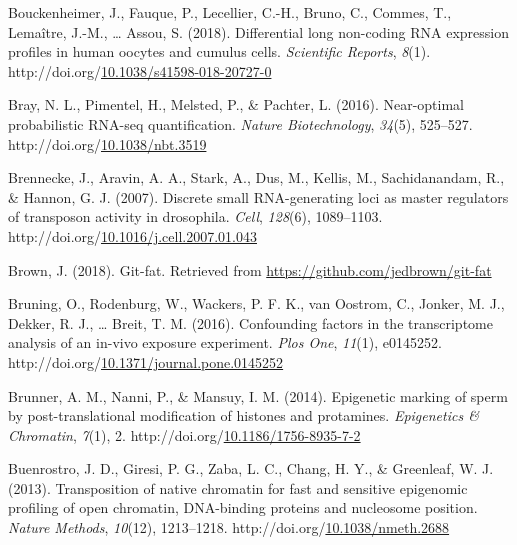 \documentclass[12pt,twoside]{reedthesis}
\newlength{\cslhangindent}
\newenvironment{CSLReferences}[2] %
 {%
  \setlength{\parindent}{0pt}
  \ifodd #1 \everypar{\setlength{\hangindent}{\cslhangindent}}\ignorespaces\fi
  \ifnum #2 > 0
  \setlength{\parskip}{#2\baselineskip}
  \fi
 }%
 {}
\begin{document}
\begin{CSLReferences}{1}{0}
\leavevmode{}%
Bouckenheimer, J., Fauque, P., Lecellier, C.-H., Bruno, C., Commes, T., Lemaître, J.-M., \ldots{} Assou, S. (2018). Differential long non-coding RNA expression profiles in human oocytes and cumulus cells. \emph{Scientific Reports}, \emph{8}(1). http://doi.org/\href{https://doi.org/10.1038/s41598-018-20727-0}{10.1038/s41598-018-20727-0}

\leavevmode{}%
Bray, N. L., Pimentel, H., Melsted, P., \& Pachter, L. (2016). Near-optimal probabilistic RNA-seq quantification. \emph{Nature Biotechnology}, \emph{34}(5), 525--527. http://doi.org/\href{https://doi.org/10.1038/nbt.3519}{10.1038/nbt.3519}

\leavevmode{}%
Brennecke, J., Aravin, A. A., Stark, A., Dus, M., Kellis, M., Sachidanandam, R., \& Hannon, G. J. (2007). Discrete small RNA-generating loci as master regulators of transposon activity in drosophila. \emph{Cell}, \emph{128}(6), 1089--1103. http://doi.org/\href{https://doi.org/10.1016/j.cell.2007.01.043}{10.1016/j.cell.2007.01.043}

\leavevmode{}%
Brown, J. (2018). Git-fat. Retrieved from \url{https://github.com/jedbrown/git-fat}

\leavevmode{}%
Bruning, O., Rodenburg, W., Wackers, P. F. K., van Oostrom, C., Jonker, M. J., Dekker, R. J., \ldots{} Breit, T. M. (2016). Confounding factors in the transcriptome analysis of an in-vivo exposure experiment. \emph{Plos One}, \emph{11}(1), e0145252. http://doi.org/\href{https://doi.org/10.1371/journal.pone.0145252}{10.1371/journal.pone.0145252}

\leavevmode{}%
Brunner, A. M., Nanni, P., \& Mansuy, I. M. (2014). Epigenetic marking of sperm by post-translational modification of histones and protamines. \emph{Epigenetics \& Chromatin}, \emph{7}(1), 2. http://doi.org/\href{https://doi.org/10.1186/1756-8935-7-2}{10.1186/1756-8935-7-2}

\leavevmode{}%
Buenrostro, J. D., Giresi, P. G., Zaba, L. C., Chang, H. Y., \& Greenleaf, W. J. (2013). Transposition of native chromatin for fast and sensitive epigenomic profiling of open chromatin, DNA-binding proteins and nucleosome position. \emph{Nature Methods}, \emph{10}(12), 1213--1218. http://doi.org/\href{https://doi.org/10.1038/nmeth.2688}{10.1038/nmeth.2688}


\end{CSLReferences}
\end{document}
